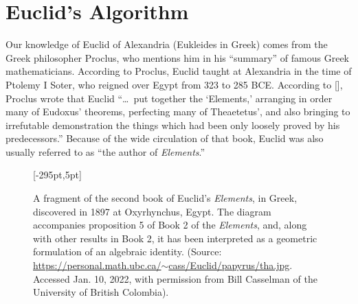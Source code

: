 {\section{\label{sec:1.4}Euclid's Algorithm}

Our knowledge of Euclid of Alexandria
(Eukleides in Greek) comes from the Greek philosopher Proclus, who mentions him in his ``summary'' of famous Greek mathematicians. According to Proclus, Euclid taught at Alexandria in the time of Ptolemy I Soter, who reigned over Egypt from 323 to 285 BCE. According to \citeauthor{chap:01:Richeson:2012} [\citeyear{chap:01:Richeson:2012}], Proclus wrote that Euclid ``\ldots~put together the `Elements,' arranging in order many of Eudoxus' theorems, perfecting many of Theaetetus', and also bringing to irrefutable demonstration the things which had been only loosely proved by his predecessors.'' Because of the wide circulation of that book, Euclid was also usually referred to as ``the author of \textit{Elements}.''

\begin{figure}[t!]
\hspace*{-65pt}[-295pt,5pt]
\caption{\label{fig:1.2}A fragment of the second book of Euclid's
\textit{Elements}, in Greek, discovered in 1897 at Oxyrhynchus, Egypt. The diagram accompanies proposition 5 of Book 2 of the \textit{Elements}, and, along with other results in Book 2, it has been interpreted as a geometric formulation of an algebraic identity. (Source: \href{https://personal.math.ubc.ca/~cass/Euclid/papyrus/tha.jpg}{https://{\allowbreak}personal.{\allowbreak}math.{\allowbreak}ubc.{\allowbreak}ca/$\sim$cass/{\allowbreak}Euclid/{\allowbreak}papyrus/{\allowbreak}tha.jpg}. Accessed Jan. 10, 2022, with permission from Bill Casselman of the University of British Colombia).}
\end{figure}

}
